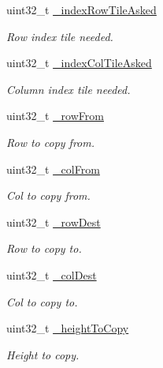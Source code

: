 \begin{DoxyCompactItemize}
\item 
uint32\+\_\+t \hyperlink{classfi_1_1HTGSTileRequestData_a224a4defe601cf729a7a5775e4f4a96e}{\+\_\+index\+Row\+Tile\+Asked}
\begin{DoxyCompactList}\small\item\em Row index tile needed. \end{DoxyCompactList}\item 
uint32\+\_\+t \hyperlink{classfi_1_1HTGSTileRequestData_a3c72f26e4d775d864880418272c490d1}{\+\_\+index\+Col\+Tile\+Asked}
\begin{DoxyCompactList}\small\item\em Column index tile needed. \end{DoxyCompactList}\item 
uint32\+\_\+t \hyperlink{classfi_1_1HTGSTileRequestData_ac2dde84293f328b38408cf42ffc5f267}{\+\_\+row\+From}
\begin{DoxyCompactList}\small\item\em Row to copy from. \end{DoxyCompactList}\item 
uint32\+\_\+t \hyperlink{classfi_1_1HTGSTileRequestData_a85fbf2300bbed12b1a24d00dfc3988ac}{\+\_\+col\+From}
\begin{DoxyCompactList}\small\item\em Col to copy from. \end{DoxyCompactList}\item 
uint32\+\_\+t \hyperlink{classfi_1_1HTGSTileRequestData_a2b3c47b59ebf062e0bbffa24301c4754}{\+\_\+row\+Dest}
\begin{DoxyCompactList}\small\item\em Row to copy to. \end{DoxyCompactList}\item 
uint32\+\_\+t \hyperlink{classfi_1_1HTGSTileRequestData_a3039cfe51208325fa4a54eb12320fd16}{\+\_\+col\+Dest}
\begin{DoxyCompactList}\small\item\em Col to copy to. \end{DoxyCompactList}\item 
uint32\+\_\+t \hyperlink{classfi_1_1HTGSTileRequestData_a3969cdb64ee0d894d4d86eb739010999}{\+\_\+height\+To\+Copy}
\begin{DoxyCompactList}\small\item\em Height to copy. \end{DoxyCompactList}\item 

\end{DoxyCompactItemize}
